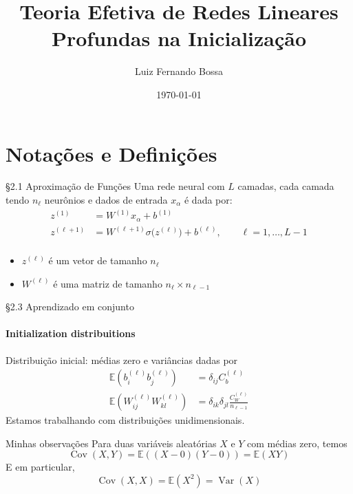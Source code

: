 \documentclass{beamer}
\title{Teoria Efetiva de Redes Lineares Profundas na Inicialização}
\author{Luiz Fernando Bossa}
\date{\today}
\institute{Universidade Federal de Santa Catarina}
\newcommand{\EE}{\mathbb{E}}
\DeclareMathOperator{\Cov}{Cov}
\DeclareMathOperator{\Var}{Var}
\def\eell{{(\ell)}}
\def\eellum{{(\ell+1)}}
\begin{document}
{ 
\frame{\titlepage}}
\frame{\tableofcontents}


\section{Notações e Definições}    
\begin{frame}
\tableofcontents[currentsection]
\end{frame}


\begin{frame}{\S 2.1 Aproximação de Funções}
Uma rede neural com $L$ camadas, cada camada tendo $n_\ell$ neurônios e dados de entrada $x_\alpha$ é dada por:
\begin{align*}
	z^{(1)} &= W^{(1)} x_\alpha + b^{(1)}  \\\tag{2.5}\label{eq:NN}
	z^\eellum &= W^\eellum \sigma\big(z^\eell\big) + b^\eell, \qquad \ell = 1, \ldots, L-1 \\
\end{align*}
\begin{itemize}
	\item $z^\eell$ é um vetor de tamanho $n_\ell$ 
	\item $W^\eell$ é uma matriz de tamanho $n_\ell \times n_{\ell-1}$
\end{itemize}


\end{frame}
 
\begin{frame}{\S 2.3 Aprendizado em conjunto}
	\framesubtitle{Initialization distribuitions}
	Distribuição inicial: médias zero e variâncias dadas por
	\begin{align*}
		\EE\left(b^\eell_{i}b^\eell_j\right) &= \delta_{ij}C_b^\eell  \tag{2.19}\\
		\EE\left(W^\eell_{ij}W^\eell_{kl}\right) &= \delta_{ik}\delta_{jl}\frac{C_W^\eell}{n_{\ell-1}} \tag{2.20}	
	\end{align*}
	Estamos trabalhando com distribuições unidimensionais.
\end{frame}


\begin{frame}{Minhas observações}
	Para duas variáveis aleatórias $X$ e $Y$ com médias zero, temos 
	$$\Cov(X,Y) = \EE((X-0)(Y-0)) = \EE(XY)$$
	E em particular, 
	$$\Cov(X,X) = \EE(X^2) = \Var(X)$$
\end{frame}
\end{document}
